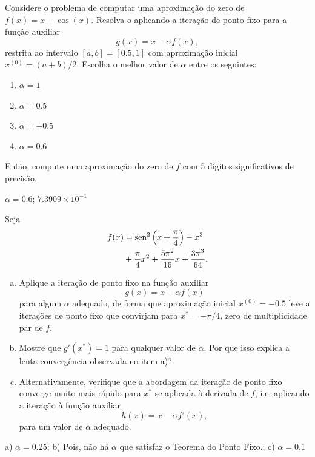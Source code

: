 \begin{exer}
  Considere o problema de computar uma aproximação do zero de $f(x)=x-\cos(x)$. Resolva-o aplicando a iteração de ponto fixo para a função auxiliar
  \begin{equation}
    g(x) = x - \alpha f(x),
  \end{equation}
restrita ao intervalo $[a, b] = [0.5, 1]$ com aproximação inicial $x^{(0)}=(a+b)/2$. Escolha o melhor valor de $\alpha$ entre os seguintes:
\begin{enumerate}
\item $\alpha = 1$
\item $\alpha = 0.5$
\item $\alpha = -0.5$
\item $\alpha = 0.6$
\end{enumerate}
Então, compute uma aproximação do zero de $f$ com $5$ dígitos significativos de precisão.
\end{exer}
\begin{resp}
  $\alpha=0.6$; $7.3909\times 10^{-1}$
\end{resp}

\begin{exer}
  Seja
  \begin{equation}
    \begin{aligned}
      f(x) &= \operatorname{sen}^2\left(x+\frac{\pi}{4}\right) - x^3\\
      &+ \frac{\pi}{4}x^2 + \frac{5\pi^2}{16}x + \frac{3\pi^3}{64}.
    \end{aligned}
\end{equation}
  \begin{enumerate}[a)]
  \item Aplique a iteração de ponto fixo na função auxiliar
    \begin{equation}
      g(x) = x - \alpha f(x)
    \end{equation}
    para algum $\alpha$ adequado, de forma que aproximação inicial $x^{(0)}=-0.5$ leve a iterações de ponto fixo que convirjam para $x^*=-\pi/4$, zero de multiplicidade par de $f$.
  \item Mostre que $g'(x^*) = 1$ para qualquer valor de $\alpha$. Por que isso explica a lenta convergência observada no item a)?
  \item Alternativamente, verifique que a abordagem da iteração de ponto fixo converge muito mais rápido para $x^*$ se aplicada à derivada de $f$, i.e. aplicando a iteração à função auxiliar
    \begin{equation}
      h(x) = x - \alpha f'(x),
    \end{equation}
    para um valor de $\alpha$ adequado.
  \end{enumerate}
\end{exer}
\begin{resp}
  a) $\alpha = 0.25$; b) Pois, não há $\alpha$ que satisfaz o Teorema do Ponto Fixo.; c) $\alpha = 0.1$
\end{resp}

